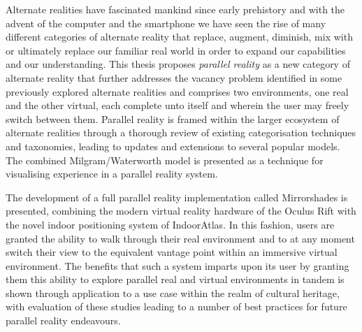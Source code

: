 Alternate realities have fascinated mankind since early prehistory and with the advent of the computer and the smartphone we have seen the rise of many different categories of alternate reality that replace, augment, diminish, mix with or ultimately replace our familiar real world in order to expand our capabilities and our understanding. This thesis proposes \textit{parallel reality} as a new category of alternate reality that further addresses the vacancy problem identified in some previously explored alternate realities and comprises two environments, one real and the other virtual, each complete unto itself and wherein the user may freely switch between them. Parallel reality is framed within the larger ecosystem of alternate realities through a thorough review of existing categorisation techniques and taxonomies, leading to updates and extensions to several popular models. The combined Milgram/Waterworth model is presented as a technique for visualising experience in a parallel reality system.

The development of a full parallel reality implementation called Mirrorshades is presented, combining the modern virtual reality hardware of the Oculus Rift with the novel indoor positioning system of IndoorAtlas. In this fashion, users are granted the ability to walk through their real environment and to at any moment switch their view to the equivalent vantage point within an immersive virtual environment. The benefits that such a system imparts upon its user by granting them this ability to explore parallel real and virtual environments in tandem is shown through application to a use case within the realm of cultural heritage, with evaluation of these studies leading to a number of best practices for future parallel reality endeavours.
